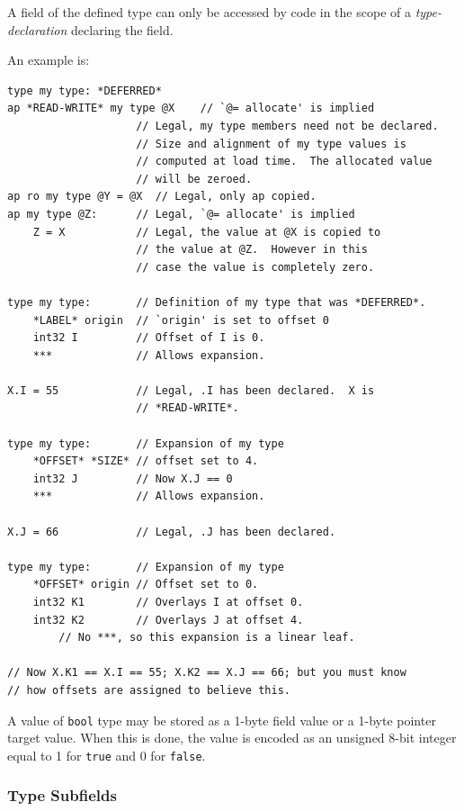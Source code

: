 \documentclass[12pt]{article}
\newenvironment{indpar}[1][0.3in]%
	{\begin{list}{}%
		     {\setlength{\itemsep}{0in}%
		      \setlength{\topsep}{0in}%
		      \setlength{\parsep}{1ex}%
		      \setlength{\labelwidth}{#1}%
		      \setlength{\leftmargin}{#1}%
		      \addtolength{\leftmargin}{\labelsep}}%
	 \item}%
	{\end{list}}
\begin{document}
A field of
the defined type can only be accessed by code in the scope
of a {\em type-declaration} declaring the field.

An example is:

\begin{indpar}\begin{verbatim}
type my type: *DEFERRED*
ap *READ-WRITE* my type @X    // `@= allocate' is implied
                    // Legal, my type members need not be declared.
                    // Size and alignment of my type values is
                    // computed at load time.  The allocated value
                    // will be zeroed.
ap ro my type @Y = @X  // Legal, only ap copied.
ap my type @Z:      // Legal, `@= allocate' is implied
    Z = X           // Legal, the value at @X is copied to
                    // the value at @Z.  However in this
                    // case the value is completely zero.

type my type:       // Definition of my type that was *DEFERRED*.
    *LABEL* origin  // `origin' is set to offset 0
    int32 I         // Offset of I is 0.
    ***             // Allows expansion.

X.I = 55            // Legal, .I has been declared.  X is
                    // *READ-WRITE*.

type my type:       // Expansion of my type
    *OFFSET* *SIZE* // offset set to 4.
    int32 J         // Now X.J == 0
    ***             // Allows expansion.

X.J = 66            // Legal, .J has been declared.

type my type:       // Expansion of my type
    *OFFSET* origin // Offset set to 0.
    int32 K1        // Overlays I at offset 0.
    int32 K2        // Overlays J at offset 4.
        // No ***, so this expansion is a linear leaf.

// Now X.K1 == X.I == 55; X.K2 == X.J == 66; but you must know
// how offsets are assigned to believe this.
\end{verbatim}\end{indpar}

A value of {\tt bool} type may be stored as a 1-byte field value
or a 1-byte pointer target value.
When this is done, the value is encoded
as an unsigned 8-bit integer equal to 1 for {\tt true} and 0 for {\tt false}.

\subsubsection{Type Subfields}
\end{document}
